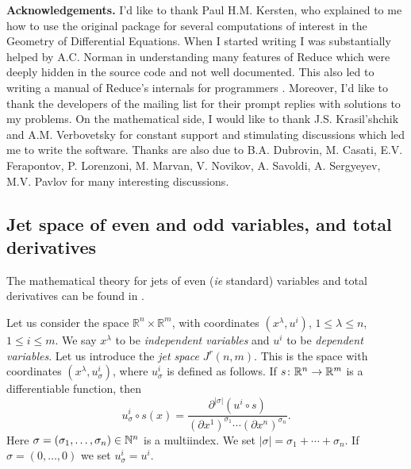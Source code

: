 \textbf{Acknowledgements.} I'd like to thank Paul H.M. Kersten, who explained
to me how to use the original \cdiff package for several computations of
interest in the Geometry of Differential Equations. When I started writing \cde
I was substantially helped by A.C. Norman in understanding many features of
Reduce which were deeply hidden in the source code and not well
documented. This also led to writing a manual of Reduce's internals for
programmers \cite{NormanVitolo:InsideReduce}. Moreover, I'd like to thank the developers of the
\REDUCE mailing list for their prompt replies with solutions to my problems.
On the mathematical side, I would like to thank J.S. Krasil'shchik and
A.M. Verbovetsky for constant support and stimulating discussions which led me
to write the software. Thanks are also due to B.A. Dubrovin, M. Casati,
E.V. Ferapontov, P. Lorenzoni, M. Marvan, V. Novikov, A. Savoldi, A. Sergyeyev,
M.V. Pavlov for many interesting discussions.

\subsection{Jet space of even and odd variables,
  and total derivatives}
\label{cdesec:jet-space-even}

The mathematical theory for jets of even (\emph{ie} standard) variables and
total derivatives can be found in \cite{Krasilshchik:99,Olver:93}.

Let us consider the space $\mathbb{R}^n\times\mathbb{R}^m$, with coordinates
$(x^\lambda,u^i)$, $1\leq \lambda\leq n$, $1\leq i\leq m$. We say $x^\lambda$
to be \emph{independent variables} and $u^i$ to be \emph{dependent variables}.
Let us introduce the \emph{jet space} $J^r(n,m)$. This is the space with
coordinates $(x^\lambda,u^i_\sigma)$, where $u^i_\sigma$ is defined as follows.
If $s\colon \mathbb{R}^n\to \mathbb{R}^m$ is a differentiable function, then
\[
  u^i_\sigma\circ s(x)=\frac{\partial^{|\sigma|}(u^i\circ s)}
  {(\partial x^1)^{\sigma_1}\cdots (\partial x^n)^{\sigma_n}}.
\]
Here $\sigma=(\sigma_1,\ldots,\sigma_n)\in\mathbb{N}^n$ is a multiindex. We set
$|\sigma|=\sigma_1+\cdots+\sigma_n$. If $\sigma=(0,\ldots,0)$ we set
$u^i_\sigma=u^i$.

